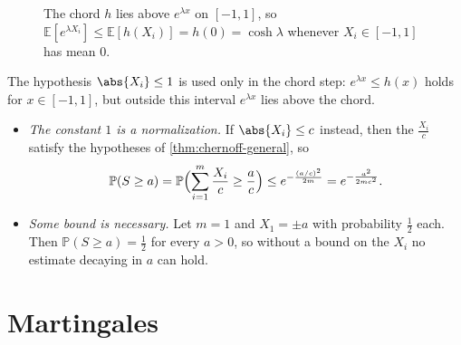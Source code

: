 \begin{figure}[H]
    \centering
    \caption{The chord \(h\) lies above \(e^{\lambda x}\) on \([-1, 1]\), so \(\mathbb{E}[e^{\lambda X_{i}}] \le \mathbb{E}[h(X_{i})] = h(0) = \cosh \lambda\) whenever \(X_{i} \in [-1, 1]\) has mean \(0\).}
    \label{fig:chord}
\end{figure}

\begin{remark}\label{rmk:chernoff-general}
    The hypothesis \(\abs{X_{i}} \le 1\) is used only in the chord step: \(e^{\lambda x} \le h(x)\) holds for \(x \in [-1, 1]\), but outside this interval \(e^{\lambda x}\) lies above the chord.
    \begin{itemize}
        \item \emph{The constant \(1\) is a normalization.} If \(\abs{X_{i}} \le c\) instead, then the \(\frac{X_{i}}{c}\) satisfy the hypotheses of \autoref{thm:chernoff-general}, so
        \[
            \mathbb{P}(S \ge a) = \mathbb{P}\Bigl( \sum_{i=1}^{m} \frac{X_{i}}{c} \ge \frac{a}{c} \Bigr) \le e^{-\frac{(a/c)^{2}}{2m}} = e^{-\frac{a^{2}}{2mc^{2}}} .
        \]
        \item \emph{Some bound is necessary.} Let \(m = 1\) and \(X_{1} = \pm a\) with probability \(\frac{1}{2}\) each. Then \(\mathbb{P}(S \ge a) = \frac{1}{2}\) for every \(a > 0\), so without a bound on the \(X_{i}\) no estimate decaying in \(a\) can hold.
    \end{itemize}
\end{remark}

\chapter{Martingales}

